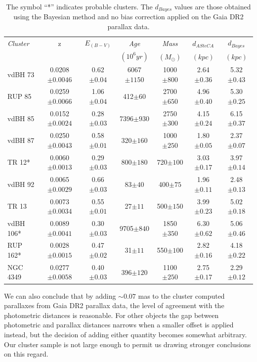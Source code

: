 \documentclass[draft]{aa}
\begin{document}
\begin{table}[ht]
\centering
\begin{tabular}{lcccccc}
\hline
 \emph{Cluster} & z & $E_{(B-V)}$ & \emph{Age} & \emph{Mass} &
 $d_{ASteCA}$ & $d_{Bayes}$
 \\
& & & $(10^6 yr)$ & $(M_{\odot})$ & $(kpc)$ & $(kpc)$\\
 \hline\hline
 vdBH 73 & 0.0208$\pm0.0046$ & 0.62$\pm0.04$ & 6067$\pm1150$ & 1000$\pm800$ &
 2.64$\pm0.36$ & 5.32$\pm0.43$\\
 RUP 85 & 0.0259$\pm0.0066$ & 1.06$\pm0.04$ & 412$\pm60$ & 2700$\pm650$ &
 4.96$\pm0.40$ & 5.30$\pm0.25$ \\
 vdBH 85 & 0.0152$\pm0.0024$ & 0.28$\pm0.03$ & 7396$\pm930$ & 2750$\pm300$ &
 4.15$\pm0.24$ & 6.15$\pm0.37$ \\
 vdBH 87 & 0.0250$\pm0.0043$ & 0.58$\pm0.01$ & 320$\pm160$ & 1000$\pm250$ &
 1.80$\pm0.05$ & 2.37$\pm0.07$ \\
 TR 12* & 0.0060$\pm0.0013$ & 0.29$\pm0.03$ & 800$\pm180$ & 720$\pm100$ &
 3.03$\pm0.17$ & 3.97$\pm0.14$ \\
 vdBH 92 & 0.0065$\pm0.0029$ & 0.66$\pm0.03$ & 83$\pm40$ & 400$\pm75$ &
 1.96$\pm0.11$ & 2.48$\pm0.13$ \\
 TR 13 & 0.0073$\pm0.0034$ & 0.55$\pm0.01$ & 27$\pm11$ & 500$\pm150$ &
 3.99$\pm0.23$ & 5.02$\pm0.18$ \\
 vdBH 106* & 0.0089$\pm0.0041$ & 0.30$\pm0.03$ & 9705$\pm840$ & 1850$\pm350$ &
 6.30$\pm0.62$ & 5.06$\pm0.46$ \\
 RUP 162* & 0.0028$\pm0.0015$ & 0.47$\pm0.02$ & 31$\pm11$ & 550$\pm100$ &
 2.82$\pm0.16$ & 4.18$\pm0.22$ \\
 NGC 4349 & 0.0277$\pm0.0058$ & 0.40$\pm0.03$ & 396$\pm120$ & 1100$\pm250$ &
 2.75$\pm0.17$ & 2.29$\pm0.12$ \\
 \hline
\end{tabular}
\caption{The symbol ``*'' indicates probable clusters. The $d_{Bayes}$ values
are those obtained using the Bayesian method and no bias correction applied on
the Gaia DR2 parallax data.}
\label{tab:final_tab}
\end{table}

We can also conclude that by adding $\sim0.07$ mas to the cluster computed
parallaxes from Gaia DR2 parallax data, the level of agreement with the
photometric distances is reasonable.
For other objects the gap between photometric and parallax distances narrows
when a smaller offset is applied instead, but the decision of
adding either quantity becomes somewhat arbitrary. Our cluster sample is not
large enough to permit us drawing stronger conclusions on this regard.\\
\end{document}
